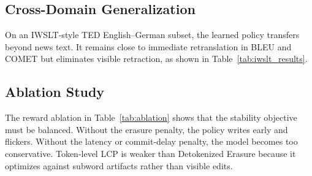 \documentclass[conference]{IEEEtran}
\begin{document}
\subsection{Cross-Domain Generalization}
On an IWSLT-style TED English--German subset, the learned policy transfers beyond news text. It remains close to immediate retranslation in BLEU and COMET but eliminates visible retraction, as shown in Table~\ref{tab:iwslt_results}.

\begin{table}[t]
\centering
\caption{IWSLT-style TED English--German generalization.}
\label{tab:iwslt_results}
\end{table}

\subsection{Ablation Study}
The reward ablation in Table~\ref{tab:ablation} shows that the stability objective must be balanced. Without the erasure penalty, the policy writes early and flickers. Without the latency or commit-delay penalty, the model becomes too conservative. Token-level LCP is weaker than Detokenized Erasure because it optimizes against subword artifacts rather than visible edits.

\begin{table}[t]
\centering
\caption{Reward component ablation.}
\label{tab:ablation}
\end{table}
\end{document}

